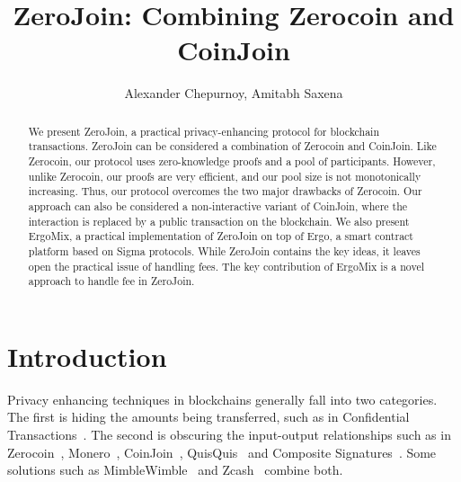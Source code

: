 \documentclass[runningheads]{llncs}
\newcommand{\mixname}{ErgoMix\xspace}
\newcommand{\zerocoin}{Zerocoin\xspace}
\begin{document}
\newcommand{\algname}{ZeroJoin\xspace}
\title{\algname: Combining \zerocoin and CoinJoin}

\author{Alexander Chepurnoy, Amitabh Saxena}


\maketitle

\begin{abstract}

We present \algname, a practical privacy-enhancing protocol for blockchain transactions. \algname can be considered a combination of \zerocoin and CoinJoin. 
Like \zerocoin, our protocol uses zero-knowledge proofs and a pool of
participants. However, unlike \zerocoin, our proofs are very efficient, and our pool size is not monotonically increasing.
Thus, our protocol overcomes the two major drawbacks of \zerocoin. Our approach can also be considered a non-interactive variant of CoinJoin, where the interaction is replaced by a public transaction on the blockchain. We also present \mixname, a practical implementation of \algname on top of Ergo, a smart contract platform based on Sigma protocols. While \algname contains the key ideas, it leaves open the practical issue of handling fees. The key contribution of \mixname is a novel approach to handle fee in \algname. 

\end{abstract}

\section{Introduction}
\label{intro}

Privacy enhancing techniques in blockchains generally fall into two categories. The first is hiding the amounts being transferred, such as in Confidential Transactions~\cite{ct}. The second is obscuring the input-output relationships such as in \zerocoin~\cite{zerocoin}, Monero~\cite{monero}, CoinJoin~\cite{coinjoin}, QuisQuis~\cite{quisquis} and Composite Signatures~\cite{composite}. Some solutions such as MimbleWimble~\cite{mw} and Zcash~\cite{zcash,zcash1} combine both.
\end{document}
